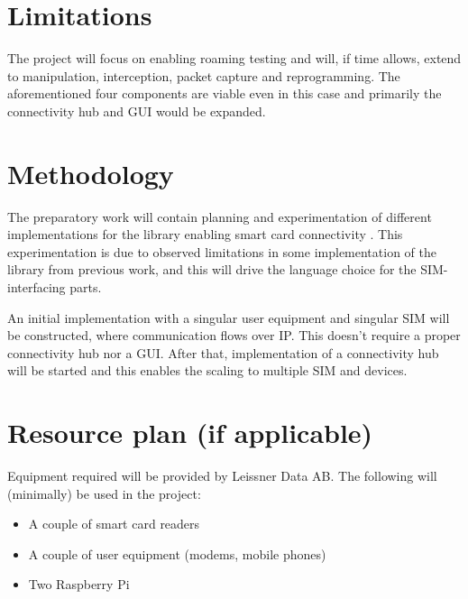 \documentclass[12pt]{article}
\begin{document}
\section*{Limitations}
The project will focus on enabling roaming testing and will, if
time allows, extend to manipulation, interception, packet capture
and reprogramming. The aforementioned four components are viable
even in this case and primarily the connectivity hub and GUI would
be expanded.

\section*{Methodology}

The preparatory work will contain planning and experimentation of
different implementations for the library enabling smart card
connectivity \cite{pcsc}. This experimentation is due to
observed limitations in some implementation of the library from
previous work, and this will drive the language choice for the
SIM-interfacing parts.

An initial implementation with a singular user equipment and
singular SIM will be constructed, where communication flows over
IP. This doesn't require a proper connectivity hub nor a GUI.
After that, implementation of a connectivity hub will be started
and this enables the scaling to multiple SIM and devices.

\section*{Resource plan (if applicable)}
Equipment required will be provided by Leissner Data AB.
The following will (minimally) be used in the project:

\begin{itemize}
    \item A couple of smart card readers
    \item A couple of user equipment (modems, mobile phones)
    \item Two Raspberry Pi
\end{itemize}

\printbibliography[
    heading=bibintoc,
    title={References}
]
\end{document}
